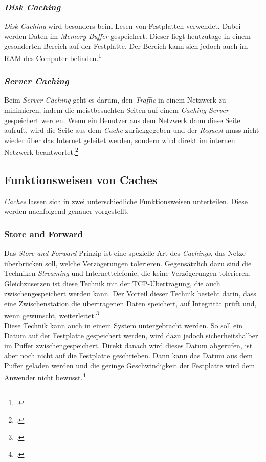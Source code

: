\subsubsection*{\textit{Disk Caching}}
\textit{Disk Caching} wird besonders beim Lesen von Festplatten verwendet. Dabei werden Daten im \textit{Memory Buffer} gespeichert. Dieser liegt heutzutage in einem gesonderten Bereich auf der Festplatte. Der Bereich kann sich jedoch auch im \ac{RAM} des Computer befinden.\footcite{Cache-Techtarget-DiskCache}
\subsubsection*{\textit{Server Caching}}
Beim \textit{Server Caching} geht es darum, den \textit{Traffic} in einem Netzwerk zu minimieren, indem die meistbesuchten Seiten auf einem \textit{Caching Server} gespeichert werden. Wenn ein Benutzer aus dem Netzwerk dann diese Seite aufruft, wird die Seite aus dem \textit{Cache} zurückgegeben und der \textit{Request} muss nicht wieder über das Internet geleitet werden, sondern wird direkt im internen Netzwerk beantwortet.\footcite{Cache-ProxyCache}
\subsection{Funktionsweisen von Caches}
\label{ssec:cache-funktionsweisen}
\textit{Caches} lassen sich in zwei unterschiedliche Funktionsweisen unterteilen. Diese werden nachfolgend genauer vorgestellt.
\subsubsection*{Store and Forward}
\label{sssec:cache-store-forward}
Das \textit{Store and Forward}-Prinzip ist eine spezielle Art des \textit{Cachings}, das Netze überbrücken soll, welche Verzögerungen tolerieren. Gegensätzlich dazu sind die Techniken \textit{Streaming} und Internettelefonie, die keine Verzögerungen tolerieren. Gleichzusetzen ist diese Technik mit der \ac{TCP}-Übertragung, die auch zwischengespeichert werden kann. Der Vorteil dieser Technik besteht darin, dass eine Zwischenstation die übertragenen Daten speichert, auf Integrität prüft und, wenn gewünscht, weiterleitet.\footcite{Cache-StoreForward}\\
Diese Technik kann auch in einem System untergebracht werden. So soll ein Datum auf der Festplatte gespeichert werden, wird dazu jedoch sicherheitshalber im Puffer zwischengespeichert. Direkt danach wird dieses Datum abgerufen, ist aber noch nicht auf die Festplatte geschrieben. Dann kann das Datum aus dem Puffer geladen werden und die geringe Geschwindigkeit der Festplatte wird dem Anwender nicht bewusst.\footcite{Cache-StoreForwardSOA}
